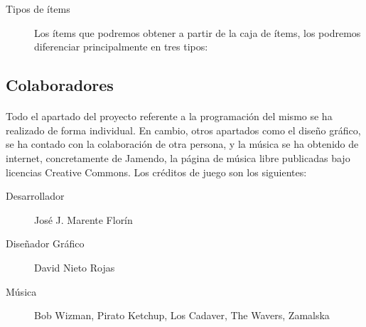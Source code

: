 \documentclass[a4paper,11pt]{article} %
\begin{document}
\begin{description}
\item [Tipos de ítems]

Los ítems que podremos obtener a partir de la caja de ítems, los podremos diferenciar principalmente en tres tipos:


\end{description}

\subsection{Colaboradores}

\paragraph{}
Todo el apartado del proyecto referente a la programación del mismo se ha realizado de forma individual. En cambio, otros apartados
como el diseño gráfico, se ha contado con la colaboración de otra persona, y la música se ha obtenido de internet, concretamente 
de Jamendo, la página de música libre publicadas bajo licencias Creative Commons. Los créditos de juego son los siguientes:

\begin{description}
    \item [Desarrollador] José J. Marente Florín
    \item [Diseñador Gráfico] David Nieto Rojas
    \item [Música] Bob Wizman, Pirato Ketchup, Los Cadaver, The Wavers, Zamalska 
\end{description}

\end{document}
